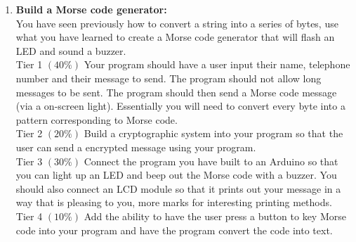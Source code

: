 \begin{enumerate}
	  \item \textbf{Build a Morse code generator:}\\
	  You have seen previously how to convert a string into a series of bytes, use what you have learned to create a Morse code generator that will flash an LED and sound a buzzer.\\
	  
	  Tier 1 $\left(40\%\right)$ Your program should have a user input their name, telephone number and their message to send. The program should not allow long messages to be sent. The program should then send a Morse code message (via a on-screen light). Essentially you will need to convert every byte into a pattern corresponding to Morse code.\\
	  
	  Tier 2 $\left(20\%\right)$ Build a cryptographic system into your program so that the user can send a encrypted message using your program.\\
	  
	  Tier 3 $\left(30\%\right)$ Connect the program you have built to an Arduino so that you can light up an LED and beep out the Morse code with a buzzer. You should also connect an LCD module so that it prints out your message in a way that is pleasing to you, more marks for interesting printing methods.\\
	  
	  Tier 4 $\left(10\%\right)$ Add the ability to have the user press a button to key Morse code into your program and have the program convert the code into text.\\
\end{enumerate}